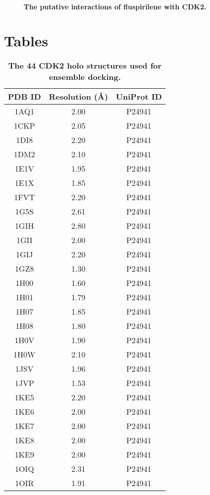 \documentclass[10pt]{article}
\begin{document}
\begin{figure}[!ht]
\begin{center}
\end{center}
\caption{
{\bf The putative interactions of fluspirilene with CDK2.}
}
\label{1GZ8-ZINC00537755-pv}
\end{figure}

\section*{Tables}

\begin{table}[!ht]
\caption{
\bf{The 44 CDK2 holo structures used for ensemble docking.}}
\begin{tabular}{ccc}
\hline
PDB ID & Resolution (\AA) & UniProt ID\\
\hline
1AQ1 & 2.00 & P24941\\
1CKP & 2.05 & P24941\\
1DI8 & 2.20 & P24941\\
1DM2 & 2.10 & P24941\\
1E1V & 1.95 & P24941\\
1E1X & 1.85 & P24941\\
1FVT & 2.20 & P24941\\
1G5S & 2.61 & P24941\\
1GIH & 2.80 & P24941\\
1GII & 2.00 & P24941\\
1GIJ & 2.20 & P24941\\
1GZ8 & 1.30 & P24941\\
1H00 & 1.60 & P24941\\
1H01 & 1.79 & P24941\\
1H07 & 1.85 & P24941\\
1H08 & 1.80 & P24941\\
1H0V & 1.90 & P24941\\
1H0W & 2.10 & P24941\\
1JSV & 1.96 & P24941\\
1JVP & 1.53 & P24941\\
1KE5 & 2.20 & P24941\\
1KE6 & 2.00 & P24941\\
1KE7 & 2.00 & P24941\\
1KE8 & 2.00 & P24941\\
1KE9 & 2.00 & P24941\\
1OIQ & 2.31 & P24941\\
1OIR & 1.91 & P24941\\

\end{tabular}
\end{table}
\end{document}
